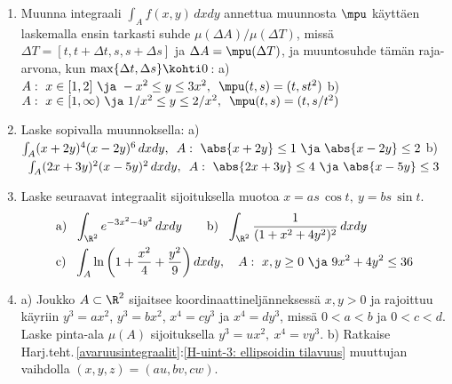 \Harj
\begin{enumerate}

\item
Muunna integraali $\int_A f(x,y)\,dxdy$ annettua muunnosta $\mpu$ käyttäen laskemalla ensin 
tarkasti suhde $\mu(\Delta A)/\mu(\Delta T)$, missä $\Delta T=[t,t+\Delta t,s,s+\Delta s]$ ja
$\Delta A=\mpu(\Delta T)$, ja muuntosuhde tämän raja-arvona, kun 
$\max\{\Delta t,\Delta s\} \kohti 0\,$: 
a) \ $A:\ x\in[1,2]\ \ja\ -x^2 \le y \le 3x^2,\,\ \mpu(t,s)=(t,st^2)$ \newline
b) \ $A:\ x\in[1,\infty)\ \ja\ 1/x^2 \le y \le 2/x^2,\,\ \mpu(t,s)=(t,s/t^2)$

\item
Laske sopivalla muunnoksella: \vspace{1mm}\newline
a) \ $\int_A (x+2y)^4(x-2y)^6\,dxdy,\,\ A:\ \abs{x+2y} \le 1\ \ja\ \abs{x-2y} \le 2$ \newline
b) \ $\int_A (2x+3y)^2(x-5y)^2\,dxdy,\,\ A:\ \abs{2x+3y} \le 4\ \ja\ \abs{x-5y} \le 3$
 
\item
Laske seuraavat integraalit sijoituksella muotoa $x=as\,\cos t,\ y=bs\,\sin t$.
\begin{align*}
&\text{a)}\ \ \int_{\R^2} e^{-3x^2-4y^2}\,dxdy \qquad
 \text{b)}\ \ \int_{\R^2} \frac{1}{(1+x^2+4y^2)^2}\,dxdy \\
&\text{c)}\ \ \int_A \ln\left(1+\frac{x^2}{4}+\frac{y^2}{9}\right)dxdy, \quad
              A:\ x,y \ge 0\ \ja\ 9x^2+4y^2 \le 36
\end{align*}

\item
a) Joukko $A\subset\R^2$ sijaitsee koordinaattineljänneksessä $x,y>0$ ja rajoittuu käyriin
$y^3=ax^2$, $y^3=bx^2$, $x^4=cy^3$ ja $x^4=dy^3$, missä $0<a<b$ ja $0<c<d$. Laske pinta-ala
$\mu(A)$ sijoituksella $y^3=ux^2,\ x^4=vy^3$. \vspace{1mm}\newline
b) Ratkaise Harj.teht.\,\ref{avaruusintegraalit}:\ref{H-uint-3: ellipsoidin tilavuus} muuttujan
vaihdolla $(x,y,z)=(au,bv,cw)$.



\end{enumerate}
